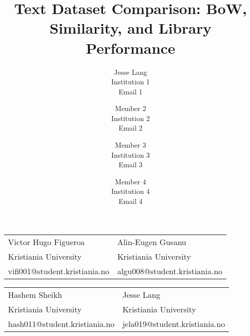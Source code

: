 \documentclass{article}
\title{Text Dataset Comparison: BoW, Similarity, and Library Performance}
\author{
  Jesse Lang \\
  Institution 1 \\
  Email 1 \and
  Member 2 \\
  Institution 2 \\
  Email 2 \and
  Member 3 \\
  Institution 3 \\
  Email 3 \and
  Member 4 \\
  Institution 4 \\
  Email 4
}
\begin{document}
\maketitle

\begin{center}
\begin{tabular}{@{}ll}
  Victor Hugo Figueroa & Alin-Eugen Gusanu \\
  Kristiania University & Kristiania University \\
  vifi001@student.kristiania.no & algu008@student.kristiania.no
\end{tabular}
\end{center}
\begin{center}
\begin{tabular}{@{}ll}
  Hashem Sheikh & Jesse Lang \\
  Kristiania University & Kristiania University \\
  hash011@student.kristiania.no & jela019@student.kristiania.no
\end{tabular}
\end{center}
\end{document}
